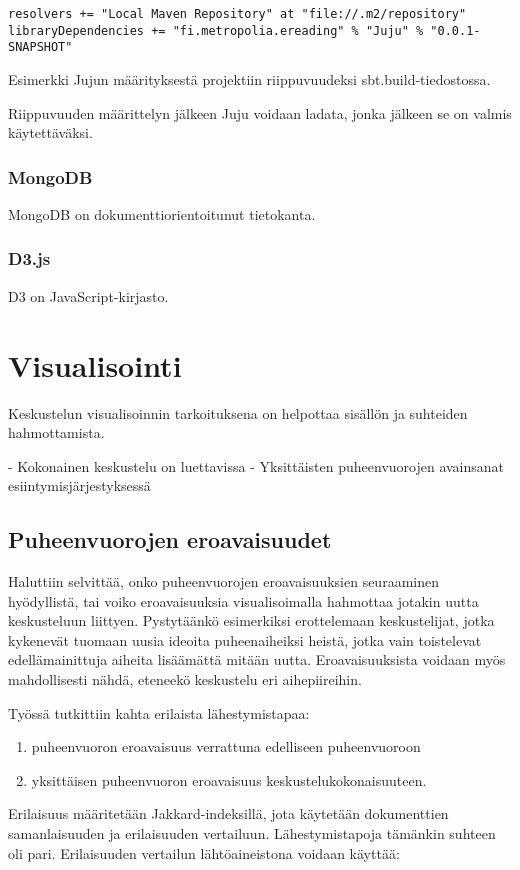 \documentclass[11pt,a4paper,oneside]{memoir}
\begin{document}
\begin{verbatim}
resolvers += "Local Maven Repository" at "file://.m2/repository"
libraryDependencies += "fi.metropolia.ereading" % "Juju" % "0.0.1-SNAPSHOT"
\end{verbatim}
Esimerkki Jujun määrityksestä projektiin riippuvuudeksi sbt.build-tiedostossa.

Riippuvuuden määrittelyn jälkeen Juju voidaan ladata, jonka jälkeen se on valmis käytettäväksi.

\subsection{MongoDB}
MongoDB on dokumenttiorientoitunut tietokanta. 

\subsection{D3.js}
D3 on JavaScript-kirjasto.

\chapter{Visualisointi}
Keskustelun visualisoinnin tarkoituksena on helpottaa sisällön ja suhteiden hahmottamista.

- Kokonainen keskustelu on luettavissa
- Yksittäisten puheenvuorojen avainsanat esiintymisjärjestyksessä

\section{Puheenvuorojen eroavaisuudet}
Haluttiin selvittää, onko puheenvuorojen eroavaisuuksien seuraaminen hyödyllistä, tai voiko eroavaisuuksia visualisoimalla hahmottaa jotakin uutta keskusteluun liittyen. Pystytäänkö esimerkiksi erottelemaan keskustelijat, jotka kykenevät tuomaan uusia ideoita puheenaiheiksi heistä, jotka vain toistelevat edellämainittuja aiheita lisäämättä mitään uutta. Eroavaisuuksista voidaan myös mahdollisesti nähdä, eteneekö keskustelu eri aihepiireihin.

Työssä tutkittiin kahta erilaista lähestymistapaa:
\begin{enumerate}
\item puheenvuoron eroavaisuus verrattuna edelliseen puheenvuoroon
\item yksittäisen puheenvuoron eroavaisuus keskustelukokonaisuuteen.
\end{enumerate}

Erilaisuus määritetään Jakkard-indeksillä, jota käytetään dokumenttien samanlaisuuden ja erilaisuuden vertailuun. Lähestymistapoja tämänkin suhteen oli pari. Erilaisuuden vertailun lähtöaineistona voidaan käyttää:
\end{document}
